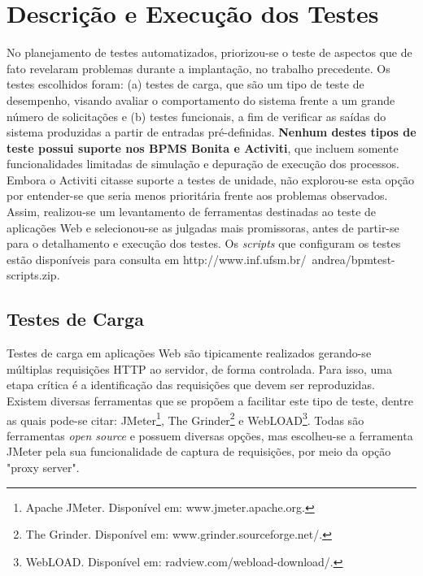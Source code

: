 \documentclass[12pt]{article}
\begin{document}
\section{Descrição e Execução dos Testes}\label{s:testes}

No planejamento de testes automatizados, priorizou-se o teste de aspectos que de fato revelaram problemas durante a implantação, no trabalho precedente.
Os testes escolhidos foram: (a) testes de carga, que são um tipo de teste de desempenho, visando avaliar o comportamento do sistema frente a um grande número de solicitações e (b) testes funcionais, a fim de verificar as saídas do sistema produzidas a partir de entradas pré-definidas. \textbf{Nenhum destes tipos de teste possui suporte nos BPMS Bonita e Activiti}, que incluem somente funcionalidades limitadas de simulação e depuração de execução dos processos. Embora o Activiti citasse suporte a testes de unidade, não explorou-se esta opção por entender-se que seria menos prioritária frente aos problemas observados.
 Assim, realizou-se um levantamento de ferramentas destinadas ao teste de aplicações Web e selecionou-se as julgadas mais promissoras, antes de partir-se para o detalhamento e execução dos testes. Os \emph{scripts} que configuram os testes estão disponíveis para consulta em http://www.inf.ufsm.br/~andrea/bpmtest-scripts.zip.

\subsection{Testes de Carga}

Testes de carga em aplicações Web são tipicamente realizados gerando-se múltiplas requisições HTTP ao servidor, de forma controlada. Para isso, uma etapa crítica é a identificação das requisições que devem ser reproduzidas. Existem diversas ferramentas que se propõem a facilitar este tipo de teste, dentre as quais pode-se citar: JMeter\footnote{Apache JMeter. Disponível em: www.jmeter.apache.org.}, The Grinder\footnote{The Grinder. Disponível em: www.grinder.sourceforge.net/.} e WebLOAD\footnote{WebLOAD. Disponível em: radview.com/webload-download/.}. Todas são ferramentas \emph{open source} e possuem diversas opções, mas escolheu-se a ferramenta JMeter pela sua funcionalidade de captura de requisições, por meio da opção "proxy server".

\end{document}
